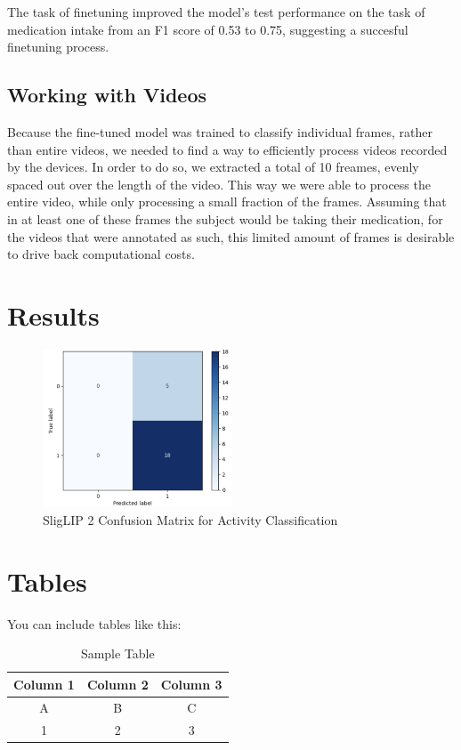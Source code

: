 \documentclass[a4paper,12pt]{article}
\begin{document}
The task of finetuning improved the model's test performance on the task of medication intake from
an F1 score of 0.53 to 0.75, suggesting a succesful finetuning process. 




\subsection{Working with Videos}
Because the fine-tuned model was trained to classify individual frames, rather than
entire videos, we needed to find a way to efficiently process videos recorded by the
devices. In order to do so, we extracted a total of 10 freames, evenly spaced out over the
length of the video. This way we were able to process the entire video, while only
processing a small fraction of the frames. Assuming that in at least one of these frames
the subject would be taking their medication, for the videos that were annotated as such, 
this limited amount of frames is desirable to drive back computational costs. 

\section{Results}
\begin{figure}[H]
    \centering
    \includegraphics[width=0.5\textwidth]{./images/test confusion matrix.png} %
    \caption{SligLIP 2 Confusion Matrix for Activity Classification}
    \label{fig:test-cm}
\end{figure}


\section{Tables}
You can include tables like this:

\begin{table}[H]
    \centering
    \begin{tabular}{|c|c|c|}
        \hline
        Column 1 & Column 2 & Column 3 \\
        \hline
        A & B & C \\
        1 & 2 & 3 \\
        \hline
    \end{tabular}
    \caption{Sample Table}
    \label{tab:sample-table}
\end{table}
\end{document}
